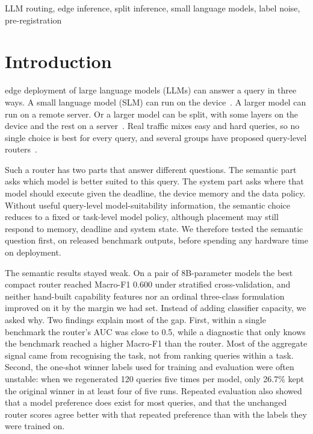 \documentclass[lettersize,journal]{IEEEtran}
\begin{document}
\begin{IEEEkeywords}
LLM routing, edge inference, split inference, small language models, label noise, pre-registration
\end{IEEEkeywords}

\section{Introduction}
 edge deployment of large language models (LLMs) can answer a query in three ways. A small language model (SLM) can run on the device~\cite{slm1,slm2}. A larger model can run on a remote server. Or a larger model can be split, with some layers on the device and the rest on a server~\cite{matsubara2022splitsurvey,Mai2023,mudvari2024splitllm}. Real traffic mixes easy and hard queries, so no single choice is best for every query, and several groups have proposed query-level routers~\cite{Ong2025,ding2024hybridllm,Song2025,Luo2026}.

Such a router has two parts that answer different questions. The semantic part asks which model is better suited to this query. The system part asks where that model should execute given the deadline, the device memory and the data policy. Without useful query-level model-suitability information, the semantic choice reduces to a fixed or task-level model policy, although placement may still respond to memory, deadline and system state. We therefore tested the semantic question first, on released benchmark outputs, before spending any hardware time on deployment.

\IEEEpubidadjcol
The semantic results stayed weak. On a pair of 8B-parameter models the best compact router reached Macro-F1 0.600 under stratified cross-validation, and neither hand-built capability features nor an ordinal three-class formulation improved on it by the margin we had set. Instead of adding classifier capacity, we asked why. Two findings explain most of the gap. First, within a single benchmark the router's AUC was close to 0.5, while a diagnostic that only knows the benchmark reached a higher Macro-F1 than the router. Most of the aggregate signal came from recognising the task, not from ranking queries within a task. Second, the one-shot winner labels used for training and evaluation were often unstable: when we regenerated 120 queries five times per model, only 26.7\% kept the original winner in at least four of five runs. Repeated evaluation also showed that a model preference does exist for most queries, and that the unchanged router scores agree better with that repeated preference than with the labels they were trained on.
\end{document}
